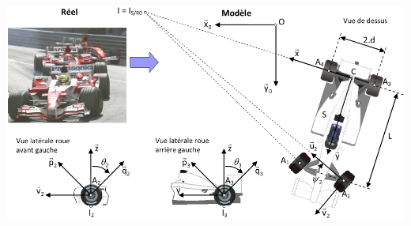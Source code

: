 \documentclass[10pt,fleqn]{article} %
\begin{document}

\vspace{4.4cm}
\pagestyle{fancy}
\thispagestyle{plain}


\def\columnseprulecolor{\color{ocre}}
\setlength{\columnseprule}{0.4pt} 


\begin{center}
\includegraphics[width=\linewidth]{images/fig_02}
\end{center}
\end{document}
